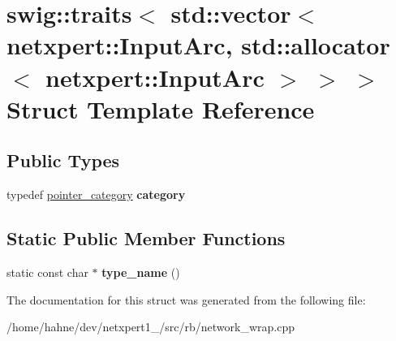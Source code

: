 \hypertarget{structswig_1_1traits_3_01std_1_1vector_3_01netxpert_1_1InputArc_00_01std_1_1allocator_3_01netxpert_1_1InputArc_01_4_01_4_01_4}{}\section{swig\+:\+:traits$<$ std\+:\+:vector$<$ netxpert\+:\+:Input\+Arc, std\+:\+:allocator$<$ netxpert\+:\+:Input\+Arc $>$ $>$ $>$ Struct Template Reference}
\label{structswig_1_1traits_3_01std_1_1vector_3_01netxpert_1_1InputArc_00_01std_1_1allocator_3_01netxpert_1_1InputArc_01_4_01_4_01_4}
\subsection*{Public Types}
\begin{DoxyCompactItemize}
\item 
typedef \hyperlink{structswig_1_1pointer__category}{pointer\+\_\+category} {\bfseries category}\hypertarget{structswig_1_1traits_3_01std_1_1vector_3_01netxpert_1_1InputArc_00_01std_1_1allocator_3_01netxpert_1_1InputArc_01_4_01_4_01_4_a867b5d70c69ecc993d49286a96caad5d}{}\label{structswig_1_1traits_3_01std_1_1vector_3_01netxpert_1_1InputArc_00_01std_1_1allocator_3_01netxpert_1_1InputArc_01_4_01_4_01_4_a867b5d70c69ecc993d49286a96caad5d}

\end{DoxyCompactItemize}
\subsection*{Static Public Member Functions}
\begin{DoxyCompactItemize}
\item 
static const char $\ast$ {\bfseries type\+\_\+name} ()\hypertarget{structswig_1_1traits_3_01std_1_1vector_3_01netxpert_1_1InputArc_00_01std_1_1allocator_3_01netxpert_1_1InputArc_01_4_01_4_01_4_afd00e17f2a2e0f466a581c7881d5e153}{}\label{structswig_1_1traits_3_01std_1_1vector_3_01netxpert_1_1InputArc_00_01std_1_1allocator_3_01netxpert_1_1InputArc_01_4_01_4_01_4_afd00e17f2a2e0f466a581c7881d5e153}

\end{DoxyCompactItemize}


The documentation for this struct was generated from the following file\+:\begin{DoxyCompactItemize}
\item 
/home/hahne/dev/netxpert1\+\_/src/rb/network\+\_\+wrap.\+cpp\end{DoxyCompactItemize}
